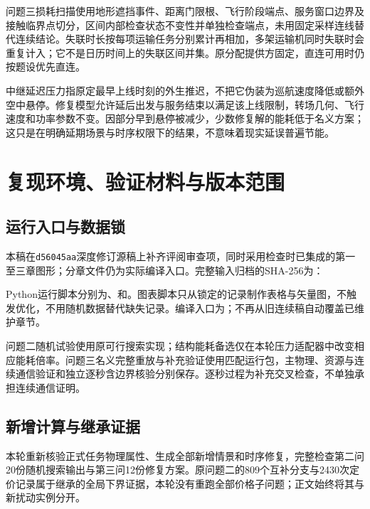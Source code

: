 \documentclass[withoutpreface,colorprint]{format}
\numberwithin{equation}{section}
\numberwithin{figure}{section}
\numberwithin{table}{section}
\begin{document}
问题三损耗扫描使用地形遮挡事件、距离门限根、飞行阶段端点、服务窗口边界及接触临界点切分，区间内部检查状态不变性并单独检查端点，未用固定采样连线替代连续结论。失联时长按每项运输任务分别累计再相加，多架运输机同时失联时会重复计入；它不是日历时间上的失联区间并集。原分配提供方固定，直连可用时仍按题设优先直连。

中继延迟压力指原定最早上线时刻的外生推迟，不把它伪装为巡航速度降低或额外空中悬停。修复模型允许延后出发与服务结束以满足该上线限制，转场几何、飞行速度和功率参数不变。因部分早到悬停被减少，少数修复解的能耗低于名义方案；这只是在明确延期场景与时序权限下的结果，不意味着现实延误普遍节能。

\section{复现环境、验证材料与版本范围}
\label{app:reproducibility}
\subsection{运行入口与数据锁}
本稿在\texttt{d56045aa}深度修订源稿上补齐评阅审查项，同时采用检查时已集成的第一至三章图形；分章文件仍为实际编译入口。完整输入归档的SHA-256为：
\begin{description}[leftmargin=0pt,labelindent=0pt]
\item[问题二正式证据包]
\item[问题三完整运行包]
\end{description}
Python运行脚本分别为、和。图表脚本只从锁定的记录制作表格与矢量图，不触发优化，不用随机数据替代缺失记录。编译入口为；不再从旧连续稿自动覆盖已维护章节。

问题二随机试验使用原可行搜索实现；结构能耗备选仅在本轮压力适配器中改变相应能耗倍率。问题三名义完整重放与补充验证使用匹配运行包，主物理、资源与连续通信验证和独立逐秒含边界核验分别保存。逐秒过程为补充交叉检查，不单独承担连续通信证明。

\subsection{新增计算与继承证据}
本轮重新核验正式任务物理属性、生成全部新增情景和时序修复，完整检查第二问20份随机搜索输出与第三问12份修复方案。原问题二的809个互补分支与2430次定价记录属于继承的全局下界证据，本轮没有重跑全部价格子问题；正文始终将其与新扰动实例分开。
\end{document}
